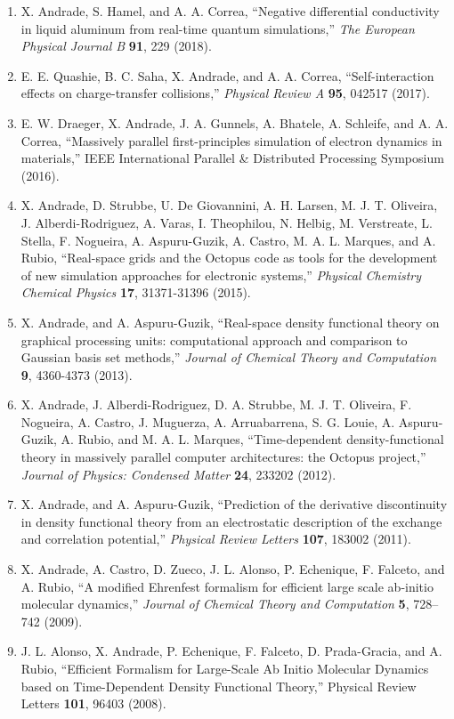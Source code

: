 \begin{enumerate}
    \item X. Andrade, S. Hamel, and A. A. Correa, “Negative differential conductivity in liquid aluminum from real-time quantum simulations,” {\it The European Physical Journal B} {\bf 91}, 229 (2018).
    \item E. E. Quashie, B. C. Saha, X. Andrade, and A. A. Correa, “Self-interaction effects on charge-transfer collisions,” {\it Physical Review A} {\bf 95}, 042517 (2017).
    \item E. W. Draeger, X. Andrade, J. A. Gunnels, A. Bhatele, A. Schleife, and A. A. Correa, “Massively parallel first-principles simulation of electron dynamics in materials,” IEEE International Parallel \& Distributed Processing Symposium (2016).
    \item X. Andrade, D. Strubbe, U. De Giovannini, A. H. Larsen, M. J. T. Oliveira, J. Alberdi-Rodriguez, A. Varas, I. Theophilou, N. Helbig, M. Verstreate, L. Stella, F. Nogueira, A. Aspuru-Guzik, A. Castro, M. A. L. Marques, and A. Rubio, “Real-space grids and the Octopus code as tools for the development of new simulation approaches for electronic systems,” {\it Physical Chemistry Chemical Physics} {\bf 17}, 31371-31396 (2015). 
    \item X. Andrade, and A. Aspuru-Guzik, “Real-space density functional theory on graphical processing units: computational approach and comparison to Gaussian basis set methods,” {\it Journal of Chemical Theory and Computation} {\bf 9}, 4360-4373 (2013).
    \item X. Andrade, J. Alberdi-Rodriguez, D. A. Strubbe, M. J. T. Oliveira, F. Nogueira, A. Castro, J. Muguerza, A. Arruabarrena, S. G. Louie, A. Aspuru-Guzik, A. Rubio, and M. A. L. Marques, “Time-dependent density-functional theory in massively parallel computer architectures: the Octopus project,” {\it Journal of Physics: Condensed Matter} {\bf 24}, 233202 (2012).
    \item X. Andrade, and A. Aspuru-Guzik, “Prediction of the derivative discontinuity in density functional theory from an electrostatic description of the exchange and correlation potential,” {\it Physical Review Letters} {\bf 107}, 183002 (2011).
    \item X. Andrade, A. Castro, D. Zueco, J. L. Alonso, P. Echenique, F. Falceto, and A. Rubio, “A modified Ehrenfest formalism for efficient large scale ab-initio molecular dynamics,” {\it Journal of Chemical Theory and Computation} {\bf 5}, 728–742 (2009).
    \item J. L. Alonso, X. Andrade, P. Echenique, F. Falceto, D. Prada-Gracia, and A. Rubio, “Efficient Formalism for Large-Scale Ab Initio Molecular Dynamics based on Time-Dependent Density Functional Theory,” Physical Review Letters {\bf 101}, 96403 (2008).
\end{enumerate}

